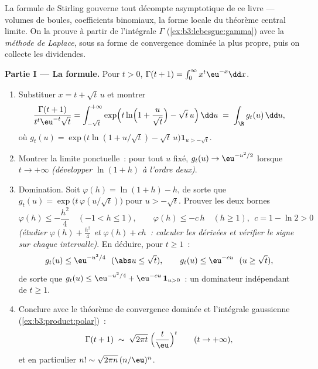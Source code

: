 \begin{problem}
\label{pb:b3:product:1}
La formule de Stirling gouverne tout décompte asymptotique de
ce livre --- volumes de boules, coefficients binomiaux, la
forme locale du théorème central limite. On la prouve à
partir de l'intégrale $\Gamma$
(\cref{ex:b3:lebesgue:gamma}) avec la \emph{méthode de
Laplace}, sous sa forme de convergence dominée la plus
propre, puis on collecte les dividendes.

\medskip
\noindent\textbf{Partie I --- La formule.} Pour $t > 0$,
$\Gamma(t + 1) = \int_0^\infty x^{t}\eu^{-x}\dd x$.
\begin{enumerate}
  \item Substituer $x = t + \sqrt t\,u$ et montrer
        \[
        \frac{\Gamma(t+1)}{t^{t}\eu^{-t}\sqrt t}
        = \int_{-\sqrt t}^{+\infty}
        \exp\Bigl(t\ln\Bigl(1 + \frac u{\sqrt
        t}\Bigr) - \sqrt t\,u\Bigr)\,\dd u
        \;=\;\int_\R g_t(u)\,\dd u,
        \]
        où $g_t(u) = \exp\bigl(t\ln(1 + u/\sqrt t) -
        \sqrt t\,u\bigr)\mathbf 1_{u > -\sqrt t}$.
  \item Montrer la limite ponctuelle~: pour tout $u$ fixé,
        $g_t(u) \to \eu^{-u^2/2}$ lorsque $t \to +\infty$
        \emph{(développer $\ln(1 + h)$ à l'ordre deux)}.
  \item Domination. Soit $\varphi(h) = \ln(1 + h) - h$, de
        sorte que $g_t(u) = \exp\bigl(t\,\varphi(u/\sqrt
        t)\bigr)$ pour $u > -\sqrt t$. Prouver les deux
        bornes
        \[
        \varphi(h) \leq -\frac{h^2}4 \quad (-1 < h \leq 1),
        \qquad
        \varphi(h) \leq -c\,h \quad (h \geq 1),\ \ c = 1 -
        \ln 2 > 0
        \]
        \emph{(étudier $\varphi(h) + \frac{h^2}4$ et
        $\varphi(h) + ch$~: calculer les dérivées et
        vérifier le signe sur chaque intervalle)}. En
        déduire, pour $t \geq 1$~:
        \[
        g_t(u) \leq \eu^{-u^2/4}\ \ (\abs u \leq \sqrt t),
        \qquad
        g_t(u) \leq \eu^{-cu}\ \ (u \geq \sqrt t),
        \]
        de sorte que $g_t(u) \leq \eu^{-u^2/4} +
        \eu^{-cu}\,\mathbf 1_{u > 0}$~: un dominateur
         indépendant de $t \geq 1$.
  \item Conclure avec le théorème de convergence dominée et
        l'intégrale gaussienne (\cref{ex:b3:product:polar})~:
        \[
        \Gamma(t + 1) \;\sim\;
        \sqrt{2\pi t}\;\Bigl(\frac t\eu\Bigr)^{t}
        \qquad (t \to +\infty),
        \]
        et en particulier $n! \sim \sqrt{2\pi
        n}\,(n/\eu)^n$.
\end{enumerate}


\end{problem}
